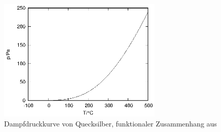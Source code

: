 \newpage

\begin{figure}[!h]
  \centering
  \includegraphics[width=0.7\textwidth]{data/fh/druck.eps}
  \caption{Dampfdruckkurve von Quecksilber, funktionaler Zusammenhang aus \cite{praktikumsheft}}
  \label{fig:druck}
\end{figure}
